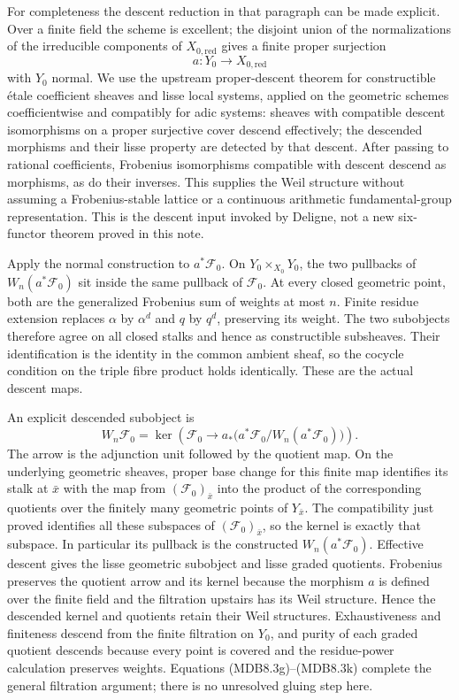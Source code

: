 \documentclass[
]{report}
\begin{document}
For completeness the descent reduction in that paragraph can be made
explicit. Over a finite field the scheme is excellent; the disjoint
union of the normalizations of the irreducible components of
\(X_{0,\mathrm{red}}\) gives a finite proper surjection \[
a:Y_0\longrightarrow X_{0,\mathrm{red}}
\tag{MDB8.3j}
\] with \(Y_0\) normal. We use the upstream proper-descent theorem for
constructible étale coefficient sheaves and lisse local systems, applied
on the geometric schemes coefficientwise and compatibly for adic
systems: sheaves with compatible descent isomorphisms on a proper
surjective cover descend effectively; the descended morphisms and their
lisse property are detected by that descent. After passing to rational
coefficients, Frobenius isomorphisms compatible with descent descend as
morphisms, as do their inverses. This supplies the Weil structure
without assuming a Frobenius-stable lattice or a continuous arithmetic
fundamental-group representation. This is the descent input invoked by
Deligne, not a new six-functor theorem proved in this note.

Apply the normal construction to \(a^*\mathcal F_0\). On
\(Y_0\times_{X_0}Y_0\), the two pullbacks of \(W_n(a^*\mathcal F_0)\)
sit inside the same pullback of \(\mathcal F_0\). At every closed
geometric point, both are the generalized Frobenius sum of weights at
most \(n\). Finite residue extension replaces \(\alpha\) by \(\alpha^d\)
and \(q\) by \(q^d\), preserving its weight. The two subobjects
therefore agree on all closed stalks and hence as constructible
subsheaves. Their identification is the identity in the common ambient
sheaf, so the cocycle condition on the triple fibre product holds
identically. These are the actual descent maps.

An explicit descended subobject is \[
W_n\mathcal F_0=
\ker\!\left(
\mathcal F_0\longrightarrow
a_*\bigl(a^*\mathcal F_0/W_n(a^*\mathcal F_0)\bigr)
\right).
\tag{MDB8.3k}
\] The arrow is the adjunction unit followed by the quotient map. On the
underlying geometric sheaves, proper base change for this finite map
identifies its stalk at \(\bar x\) with the map from
\((\mathcal F_0)_{\bar x}\) into the product of the corresponding
quotients over the finitely many geometric points of \(Y_{\bar x}\). The
compatibility just proved identifies all these subspaces of
\((\mathcal F_0)_{\bar x}\), so the kernel is exactly that subspace. In
particular its pullback is the constructed \(W_n(a^*\mathcal F_0)\).
Effective descent gives the lisse geometric subobject and lisse graded
quotients. Frobenius preserves the quotient arrow and its kernel because
the morphism \(a\) is defined over the finite field and the filtration
upstairs has its Weil structure. Hence the descended kernel and
quotients retain their Weil structures. Exhaustiveness and finiteness
descend from the finite filtration on \(Y_0\), and purity of each graded
quotient descends because every point is covered and the residue-power
calculation preserves weights. Equations (MDB8.3g)--(MDB8.3k) complete
the general filtration argument; there is no unresolved gluing step
here.
\end{document}
